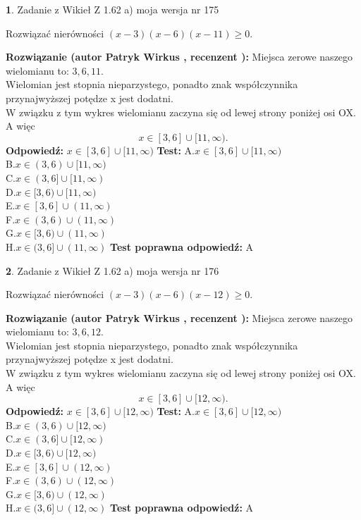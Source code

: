\documentclass[12pt, a4paper]{article}
\theoremstyle{definition} %
\newtheorem{zad}{}
\newcommand{\zadStart}[1]{\begin{zad}#1\newline}
\newcommand{\zadStop}{\end{zad}}
\newcommand{\rozwStart}[2]{\noindent \textbf{Rozwiązanie (autor #1 , recenzent #2): }\newline}
\newcommand{\rozwStop}{\newline}
\newcommand{\odpStart}{\noindent \textbf{Odpowiedź:}\newline}
\newcommand{\odpStop}{\newline}
\newcommand{\testStart}{\noindent \textbf{Test:}\newline}
\newcommand{\testStop}{\newline}
\newcommand{\kluczStart}{\noindent \textbf{Test poprawna odpowiedź:}\newline}
\newcommand{\kluczStop}{\newline}
\begin{document}
\zadStart{Zadanie z Wikieł Z 1.62 a) moja wersja nr 175}

Rozwiązać nierówności $(x-3)(x-6)(x-11)\ge0$.
\zadStop
\rozwStart{Patryk Wirkus}{}
Miejsca zerowe naszego wielomianu to: $3, 6, 11$.\\
Wielomian jest stopnia nieparzystego, ponadto znak współczynnika przy\linebreak najwyższej potędze x jest dodatni.\\ W związku z tym wykres wielomianu zaczyna się od lewej strony poniżej osi OX. A więc $$x \in [3,6] \cup [11,\infty).$$
\rozwStop
\odpStart
$x \in [3,6] \cup [11,\infty)$
\odpStop
\testStart
A.$x \in [3,6] \cup [11,\infty)$\\
B.$x \in (3,6) \cup [11,\infty)$\\
C.$x \in (3,6] \cup [11,\infty)$\\
D.$x \in [3,6) \cup [11,\infty)$\\
E.$x \in [3,6] \cup (11,\infty)$\\
F.$x \in (3,6) \cup (11,\infty)$\\
G.$x \in [3,6) \cup (11,\infty)$\\
H.$x \in (3,6] \cup (11,\infty)$
\testStop
\kluczStart
A
\kluczStop



\zadStart{Zadanie z Wikieł Z 1.62 a) moja wersja nr 176}

Rozwiązać nierówności $(x-3)(x-6)(x-12)\ge0$.
\zadStop
\rozwStart{Patryk Wirkus}{}
Miejsca zerowe naszego wielomianu to: $3, 6, 12$.\\
Wielomian jest stopnia nieparzystego, ponadto znak współczynnika przy\linebreak najwyższej potędze x jest dodatni.\\ W związku z tym wykres wielomianu zaczyna się od lewej strony poniżej osi OX. A więc $$x \in [3,6] \cup [12,\infty).$$
\rozwStop
\odpStart
$x \in [3,6] \cup [12,\infty)$
\odpStop
\testStart
A.$x \in [3,6] \cup [12,\infty)$\\
B.$x \in (3,6) \cup [12,\infty)$\\
C.$x \in (3,6] \cup [12,\infty)$\\
D.$x \in [3,6) \cup [12,\infty)$\\
E.$x \in [3,6] \cup (12,\infty)$\\
F.$x \in (3,6) \cup (12,\infty)$\\
G.$x \in [3,6) \cup (12,\infty)$\\
H.$x \in (3,6] \cup (12,\infty)$
\testStop
\kluczStart
A
\kluczStop
\end{document}
